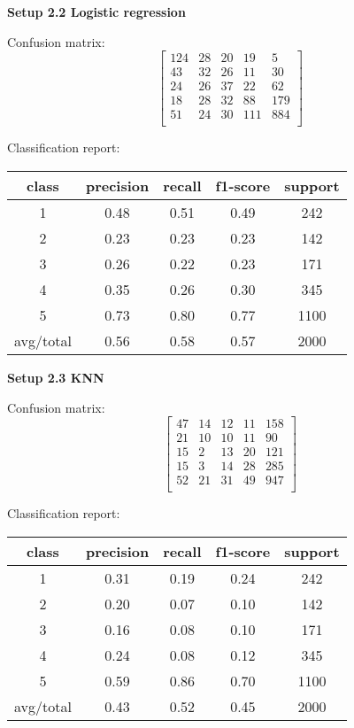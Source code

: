 \documentclass[12pt]{report}
\begin{document}
\textbf{Setup 2.2 Logistic regression}

Confusion matrix:
\[
\begin{bmatrix}
124 & 28 & 20 & 19 & 5 \\
43 & 32 & 26 & 11 & 30 \\
24 & 26 & 37 & 22 & 62 \\
18 & 28 & 32 & 88 & 179 \\
51 & 24 & 30 & 111 & 884 \\
\end{bmatrix}
\]

Classification report:

\begin{center}
	\begin{tabular}{c | c | c | c | c }
		\hline
		class & precision & recall & f1-score & support \\ \hline
		1 & 0.48 & 0.51 & 0.49 & 242 \\ \hline
		2 & 0.23 & 0.23 & 0.23 & 142 \\ \hline
		3 & 0.26 & 0.22 & 0.23 & 171 \\ \hline
		4 & 0.35 & 0.26 & 0.30 & 345 \\ \hline
		5 & 0.73 & 0.80 & 0.77 & 1100 \\ \hline
		avg/total & 0.56 & 0.58 & 0.57 & 2000 \\ \hline
	\end{tabular}
\end{center}

\textbf{Setup 2.3 KNN}

Confusion matrix:
\[
\begin{bmatrix}
47 & 14 & 12 & 11 & 158 \\
21 & 10 & 10 & 11 & 90 \\
15 & 2 & 13 & 20 & 121 \\
15 & 3 & 14 & 28 & 285 \\
52 & 21 & 31 & 49 & 947 \\
\end{bmatrix}
\]

Classification report:

\begin{center}
	\begin{tabular}{c | c | c | c | c }
		\hline
		class & precision & recall & f1-score & support \\ \hline
		1 & 0.31 & 0.19 & 0.24 & 242 \\ \hline
		2 & 0.20 & 0.07 & 0.10 & 142 \\ \hline
		3 & 0.16 & 0.08 & 0.10 & 171 \\ \hline
		4 & 0.24 & 0.08 & 0.12 & 345 \\ \hline
		5 & 0.59 & 0.86 & 0.70 & 1100 \\ \hline
		avg/total & 0.43 & 0.52 & 0.45 & 2000 \\ \hline
	\end{tabular}
\end{center}
\end{document}
